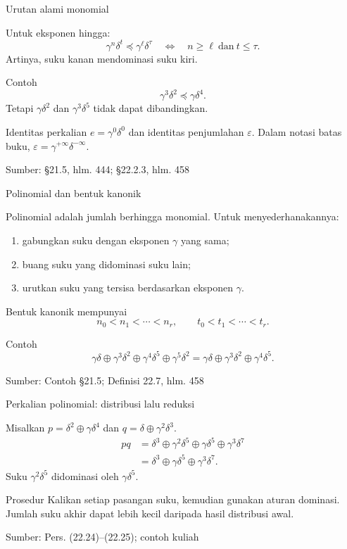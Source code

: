 \documentclass[aspectratio=169,11pt]{beamer}
\newcommand{\source}[1]{%
    \vfill
    \hfill{\tiny\color{gray}Sumber: #1}
}
\newcommand{\eps}{\varepsilon}
\begin{document}
\begin{frame}{Urutan alami monomial}


Untuk eksponen hingga:
\[
\gamma^n\delta^t\preceq\gamma^\ell\delta^\tau
\quad\Longleftrightarrow\quad n\ge\ell\ \text{dan}\ t\le\tau.
\]
Artinya, suku kanan mendominasi suku kiri.
\begin{exampleblock}{Contoh}
\[
\gamma^3\delta^2\preceq\gamma\delta^4.
\]
Tetapi $\gamma\delta^2$ dan $\gamma^3\delta^5$ tidak dapat dibandingkan.
\end{exampleblock}
Identitas perkalian $e=\gamma^0\delta^0$ dan identitas penjumlahan $\eps$.
Dalam notasi batas buku, $\eps=\gamma^{+\infty}\delta^{-\infty}$.

\source{\S21.5, hlm. 444; \S22.2.3, hlm. 458}

\end{frame}
\begin{frame}{Polinomial dan bentuk kanonik}


Polinomial adalah jumlah berhingga monomial.
Untuk menyederhanakannya:
\begin{enumerate}
\item gabungkan suku dengan eksponen $\gamma$ yang sama;
\item buang suku yang didominasi suku lain;
\item urutkan suku yang tersisa berdasarkan eksponen $\gamma$.
\end{enumerate}
Bentuk kanonik mempunyai
\[
n_0<n_1<\cdots<n_r,\qquad t_0<t_1<\cdots<t_r.
\]
\begin{exampleblock}{Contoh}
\[
\gamma\delta\oplus\gamma^3\delta^2\oplus\gamma^4\delta^5
\oplus\gamma^5\delta^2
=\gamma\delta\oplus\gamma^3\delta^2\oplus\gamma^4\delta^5.
\]
\end{exampleblock}

\source{Contoh \S21.5; Definisi 22.7, hlm. 458}

\end{frame}
\begin{frame}{Perkalian polinomial: distribusi lalu reduksi}


Misalkan $p=\delta^2\oplus\gamma\delta^4$ dan
$q=\delta\oplus\gamma^2\delta^3$.
\begin{align*}
pq&=\delta^3\oplus\gamma^2\delta^5
\oplus\gamma\delta^5\oplus\gamma^3\delta^7\\
&=\delta^3\oplus\gamma\delta^5\oplus\gamma^3\delta^7.
\end{align*}
Suku $\gamma^2\delta^5$ didominasi oleh $\gamma\delta^5$.
\begin{block}{Prosedur}
Kalikan setiap pasangan suku, kemudian gunakan aturan dominasi.
Jumlah suku akhir dapat lebih kecil daripada hasil distribusi awal.
\end{block}

\source{Pers. (22.24)--(22.25); contoh kuliah}

\end{frame}
\end{document}
